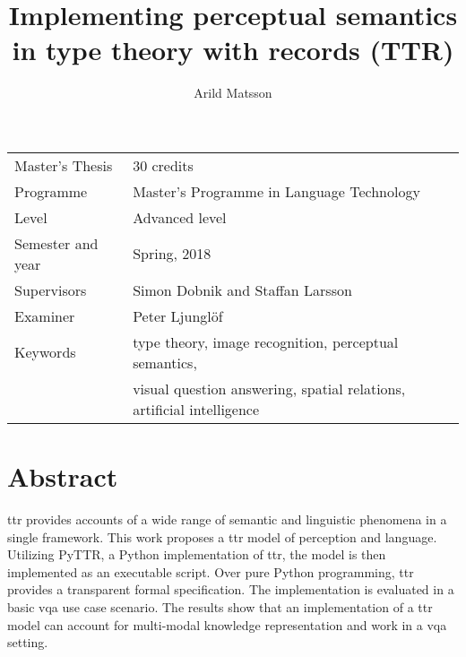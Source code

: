 \documentclass[11pt, a4paper]{article}
\title{Implementing perceptual semantics in type theory with records (TTR)}
\author{Arild Matsson}
\date{}
\begin{document}
\begin{titlepage}

\maketitle

\vfill

\begingroup
\renewcommand*{\arraystretch}{1.2}
\begin{tabular}{l@{\hskip 20mm}l}
\hline
Master's Thesis & 30 credits\\
Programme & Master’s Programme in Language Technology\\
Level & Advanced level \\
Semester and year & Spring, 2018\\
Supervisors & Simon Dobnik and Staffan Larsson \\
Examiner & Peter Ljunglöf \\
Keywords & type theory, image recognition, perceptual semantics, \\
& visual question answering, spatial relations, artificial intelligence
\end{tabular}
\endgroup

\thispagestyle{empty}
\end{titlepage}

\newpage
\singlespacing
\glsresetall
\section*{Abstract}

\Gls{ttr} provides accounts of a wide range of semantic and linguistic phenomena in a single framework.
This work proposes a \gls{ttr} model of perception and language.
Utilizing PyTTR, a Python implementation of \gls{ttr}, the model is then implemented as an executable script.
Over pure Python programming, \gls{ttr} provides a transparent formal specification.
The implementation is evaluated in a basic \gls{vqa} use case scenario.
The results show that an implementation of a \gls{ttr} model can account for multi-modal knowledge representation and work in a \gls{vqa} setting.

\end{document}
